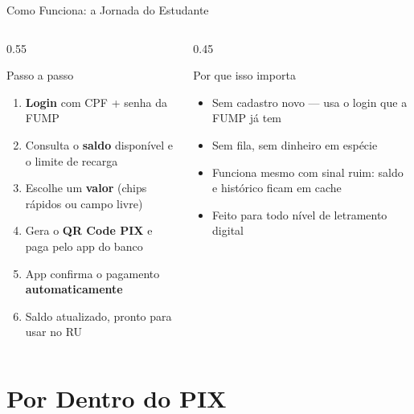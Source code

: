 \documentclass[10pt, aspectratio=169]{beamer}
\begin{document}
\begin{frame}{Como Funciona: a Jornada do Estudante}
    \begin{columns}[T]
        \begin{column}{0.55\textwidth}
            \begin{block}{Passo a passo}
                \begin{enumerate}
                    \small
                    \item \textbf{Login} com CPF + senha da FUMP
                    \item Consulta o \textbf{saldo} disponível e o limite de recarga
                    \item Escolhe um \textbf{valor} (chips rápidos ou campo livre)
                    \item Gera o \textbf{QR Code PIX} e paga pelo app do banco
                    \item App confirma o pagamento \textbf{automaticamente}
                    \item Saldo atualizado, pronto para usar no RU
                \end{enumerate}
            \end{block}
        \end{column}
        \begin{column}{0.45\textwidth}
            \begin{exampleblock}{Por que isso importa}
                \small
                \begin{itemize}
                    \item Sem cadastro novo --- usa o login que a FUMP já tem
                    \item Sem fila, sem dinheiro em espécie
                    \item Funciona mesmo com sinal ruim: saldo e histórico ficam em cache
                    \item Feito para todo nível de letramento digital
                \end{itemize}
            \end{exampleblock}
        \end{column}
    \end{columns}
\end{frame}

\section{Por Dentro do PIX}
\end{document}

